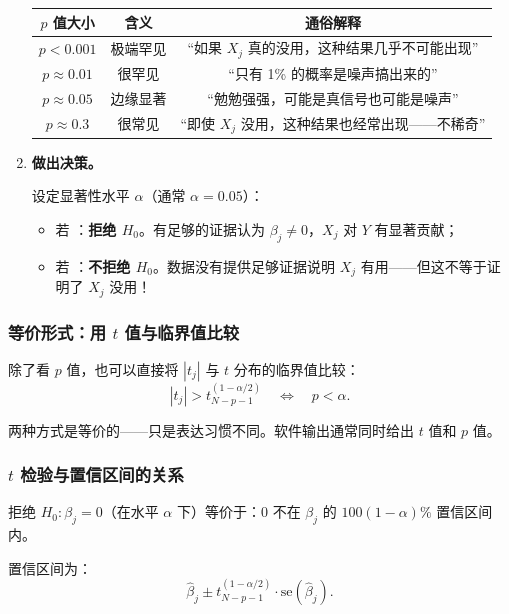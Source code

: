 \begin{enumerate}[label=\textbf{第 \arabic* 步：}, leftmargin=*]
    \begin{center}
    \begin{tabular}{c|c|c}
    \toprule
    \textbf{$p$ 值大小} & \textbf{含义} & \textbf{通俗解释} \\
    \midrule
    $p < 0.001$ & 极端罕见 & ``如果 $X_j$ 真的没用，这种结果几乎不可能出现'' \\
    $p \approx 0.01$ & 很罕见   & ``只有 1\% 的概率是噪声搞出来的'' \\
    $p \approx 0.05$ & 边缘显著 & ``勉勉强强，可能是真信号也可能是噪声'' \\
    $p \approx 0.3$  & 很常见   & ``即使 $X_j$ 没用，这种结果也经常出现——不稀奇'' \\
    \bottomrule
    \end{tabular}
    \end{center}

    \item \textbf{做出决策。}
    
    设定显著性水平 $\alpha$（通常 $\alpha = 0.05$）：
    \begin{itemize}
        \item 若 ：\textbf{拒绝 $H_0$}。有足够的证据认为 $\beta_j \neq 0$，$X_j$ 对 $Y$ 有显著贡献；
        \item 若 ：\textbf{不拒绝 $H_0$}。数据没有提供足够证据说明 $X_j$ 有用——但这不等于证明了 $X_j$ 没用！
    \end{itemize}
\end{enumerate}

\subsubsection{等价形式：用 $t$ 值与临界值比较}

除了看 $p$ 值，也可以直接将 $|t_j|$ 与 $t$ 分布的临界值比较：
\[
    |t_j| > t_{N-p-1}^{(1-\alpha/2)} \quad\Longleftrightarrow\quad p < \alpha.
\]

两种方式是等价的——只是表达习惯不同。软件输出通常同时给出 $t$ 值和 $p$ 值。

\subsubsection{$t$ 检验与置信区间的关系}

拒绝 $H_0: \beta_j = 0$（在水平 $\alpha$ 下）等价于：$0$ 不在 $\beta_j$ 的 $100(1-\alpha)\%$ 置信区间内。

置信区间为：
\begin{equation}\label{eq:ci_beta}
    \hat{\beta}_j \pm t_{N-p-1}^{(1-\alpha/2)} \cdot \mathrm{se}(\hat{\beta}_j).
\end{equation}

